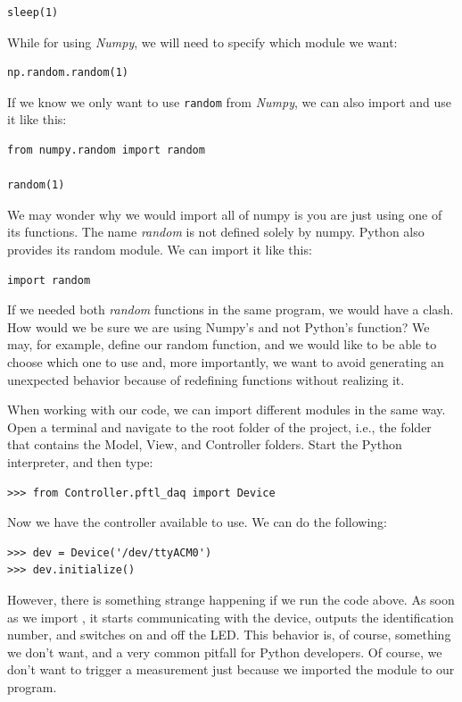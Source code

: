 \begin{verbatim}
sleep(1)
\end{verbatim}

While for using \emph{Numpy}, we will need to specify which module we want:

\begin{verbatim}
np.random.random(1)
\end{verbatim}

If we know we only want to use \texttt{random} from \emph{Numpy}, we can also import and use it like this:

\begin{verbatim}
from numpy.random import random

random(1)
\end{verbatim}

We may wonder why we would import all of numpy is you are just using one of its functions. The name \emph{random} is not defined solely by numpy. Python also provides its random module. We can import it like this:

\begin{verbatim}
import random
\end{verbatim}

If we needed both \emph{random} functions in the same program, we would have a clash. How would we be sure we are using Numpy's and not Python's function? We may, for example, define our random function, and we would like to be able to choose which one to use and, more importantly, we want to avoid generating an unexpected behavior because of redefining functions without realizing it.

When working with our code, we can import different modules in the same way. Open a terminal and navigate to the root folder of the project, i.e., the folder that contains the Model, View, and Controller folders. Start the Python interpreter, and then type:

\begin{verbatim}
>>> from Controller.pftl_daq import Device
\end{verbatim}

Now we have the controller available to use. We can do the following:

\begin{verbatim}
>>> dev = Device('/dev/ttyACM0')
>>> dev.initialize()
\end{verbatim}

However, there is something strange happening if we run the code above. As soon as we import , it starts communicating with the device, outputs the identification number, and switches on and off the LED. This behavior is, of course, something we don't want, and a very common pitfall for Python developers. Of course, we don't want to trigger a measurement just because we imported the module to our program.

